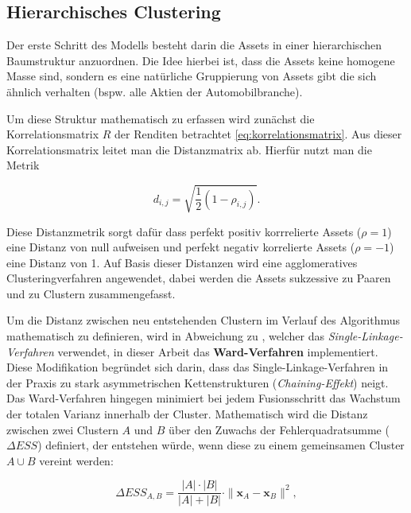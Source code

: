\documentclass[parskip=half]{scrartcl}
\begin{document}
	\subsection{Hierarchisches Clustering} 
	
	Der erste Schritt des Modells besteht darin die Assets in einer hierarchischen Baumstruktur anzuordnen. Die Idee hierbei ist, dass die Assets keine homogene Masse sind, sondern es eine natürliche Gruppierung von Assets gibt die sich ähnlich verhalten (bspw. alle Aktien der Automobilbranche).
	
	Um diese Struktur mathematisch zu erfassen wird zunächst die Korrelationsmatrix $R$ der Renditen betrachtet \eqref{eq:korrelationsmatrix}. Aus dieser Korrelationsmatrix leitet man die Distanzmatrix ab. Hierfür nutzt man die Metrik \parencite[224]{Lopez}
	
	\begin{equation}
		d_{i,j} = \sqrt{\frac{1}{2} (1- \rho_{i,j})} . \label{eq:dist_metrik}
	\end{equation}
	
	Diese Distanzmetrik sorgt dafür dass perfekt positiv korrrelierte Assets ($\rho = 1$) eine Distanz von null aufweisen und perfekt negativ korrelierte Assets ($\rho = -1$) eine Distanz von 1. Auf Basis dieser Distanzen wird eine agglomeratives Clusteringverfahren angewendet, dabei werden die Assets sukzessive zu Paaren und zu Clustern zusammengefasst. 
	
	Um die Distanz zwischen neu entstehenden Clustern im Verlauf des Algorithmus mathematisch zu definieren, wird in Abweichung zu \textcite[228]{Lopez}, welcher das \textit{Single-Linkage-Verfahren} verwendet, in dieser Arbeit das \textbf{Ward-Verfahren} \parencite{Ward1963} implementiert. Diese Modifikation begründet sich darin, dass das Single-Linkage-Verfahren in der Praxis zu stark asymmetrischen Kettenstrukturen (\textit{Chaining-Effekt}) neigt. Das Ward-Verfahren hingegen minimiert bei jedem Fusionsschritt das Wachstum der totalen Varianz innerhalb der Cluster. Mathematisch wird die Distanz zwischen zwei Clustern $A$ und $B$ über den Zuwachs der Fehlerquadratsumme ($\Delta ESS$) definiert, der entstehen würde, wenn diese zu einem gemeinsamen Cluster $A \cup B$ vereint werden:
	
	\begin{equation}
		\Delta ESS_{A,B} = \frac{|A| \cdot |B|}{|A| + |B|} \cdot \|\mathbf{x}_A - \mathbf{x}_B\|^2 , \label{eq:ward}
	\end{equation}
	
\end{document}
